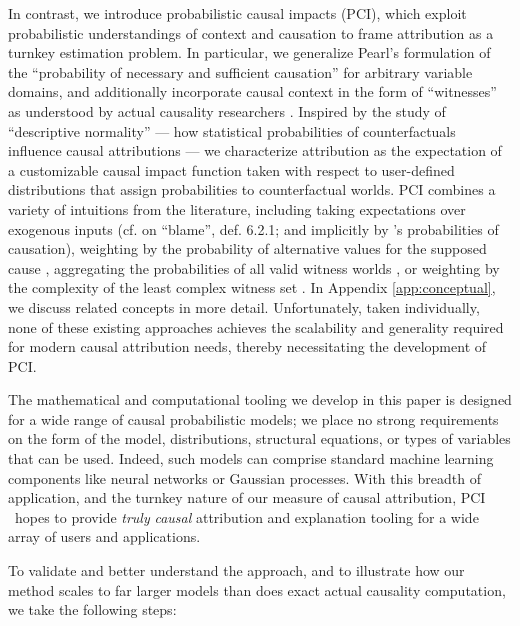 \documentclass[anon,12pt]{clear2026} %
\newcommand{\TODO}{\colorbox{orange!30}{\textbf{TODO}}}
\newcommand{\ourapproach}{PCI }
\newcommand{\Ourapproach}{PCI}
\begin{document}
In contrast, we introduce probabilistic causal impacts (\Ourapproach), which exploit probabilistic understandings of context and causation to frame attribution as a turnkey estimation problem. In particular, we generalize Pearl's formulation of the ``probability of necessary and sufficient causation'' \citep{pearl2022probabilities} for arbitrary variable domains, and additionally incorporate causal context in the form of ``witnesses'' as understood by actual causality researchers \citep{actualCausalityHalpern}. Inspired by the study of ``descriptive normality'' \citep{Halpern2015-HALGCA, icardNormalityActualCausal2017} — how statistical probabilities of counterfactuals influence causal attributions — we characterize attribution as the expectation of a customizable causal impact function taken with respect to user-defined distributions that assign probabilities to counterfactual worlds. \ourapproach combines a variety of intuitions from the literature, including taking expectations over exogenous inputs (cf. \cite{actualCausalityHalpern} on ``blame'', def. 6.2.1; and implicitly by \citeauthor{pearl2022probabilities}'s \citeyearpar{pearl2022probabilities} probabilities of causation), weighting by the probability of alternative values for the supposed cause \cite[def. 8]{Beckers2015CombiningPC},
aggregating the probabilities of all valid witness worlds \cite[\S 6.2]{Beckers2015CombiningPC}, or weighting by the complexity of the least complex witness set \cite[on ``responsibility'', def. 6.1.6]{actualCausalityHalpern}. In Appendix \ref{app:conceptual}, we discuss related concepts in more detail. Unfortunately, taken individually, none of these existing approaches achieves the scalability and generality required for modern causal attribution needs, thereby necessitating the development of \Ourapproach.

The mathematical and computational tooling we develop in this paper is designed for a wide range of causal probabilistic models; we place no strong requirements on the form of the model, distributions, structural equations, or types of variables that can be used. Indeed, such models can comprise standard machine learning components like neural networks or Gaussian processes. With this breadth of application, and the turnkey nature of our measure of causal attribution, \ourapproach\ hopes to provide \textit{truly} \textit{causal} attribution and explanation tooling for a wide array of users and applications.

To validate and better understand the approach, and to 
illustrate how our method scales to far larger models than does exact actual causality computation, we take the following steps:
\end{document}
